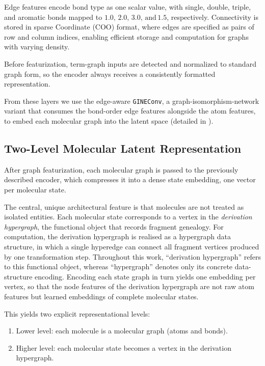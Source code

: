 Edge features encode bond type as one scalar value, with single, double, triple, and aromatic bonds mapped to $1.0, \, 2.0, \, 3.0, \, \text{and} \, 1.5$, respectively.
Connectivity is stored in sparse Coordinate (COO) format, where edges are specified as pairs of row and column indices, enabling efficient storage and computation for graphs with varying density.

Before featurization, term-graph inputs are detected and normalized to standard graph form, so the encoder always receives a consistently formatted representation.

From these layers we use the edge-aware \texttt{GINEConv}, a graph-isomorphism-network variant that consumes the bond-order edge features alongside the atom features, to embed each molecular graph into the latent space (detailed in ).


\subsection{Two-Level Molecular Latent Representation}

After graph featurization, each molecular graph is passed to the previously  described encoder, which compresses it into a dense state embedding, one vector per molecular state.

The central, unique architectural feature is that molecules are not treated as isolated entities.
Each molecular state corresponds to a vertex in the \emph{derivation hypergraph}, the functional object that records fragment genealogy.
For computation, the derivation hypergraph is realised as a hypergraph data structure, in which a single hyperedge can connect all fragment vertices produced by one transformation step.
Throughout this work, \enquote{derivation hypergraph} refers to this functional object, whereas \enquote{hypergraph} denotes only its concrete data-structure encoding.
Encoding each state graph in turn yields one embedding per vertex, so that the node features of the derivation hypergraph are not raw atom features but learned embeddings of complete molecular states.

This yields two explicit representational levels:
\begin{enumerate}
    \item Lower level: each molecule is a molecular graph (atoms and bonds).
    \item Higher level: each molecular state becomes a vertex in the derivation hypergraph.
\end{enumerate}

